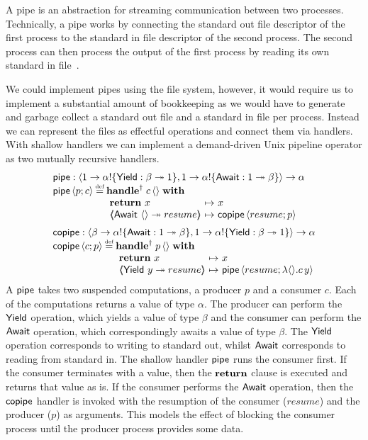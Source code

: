 \documentclass[12pt,phd,lfcs,twoside,openright,logo,leftchapter,normalheadings]{infthesis}
\theoremstyle{plain}
\theoremstyle{definition}
\begin{document}
A \UNIX{} pipe is an abstraction for streaming communication between
two processes. Technically, a pipe works by connecting the standard
out file descriptor of the first process to the standard in file
descriptor of the second process. The second process can then process
the output of the first process by reading its own standard in
file~\cite{RitchieT74}.

We could implement pipes using the file system, however, it would
require us to implement a substantial amount of bookkeeping as we
would have to generate and garbage collect a standard out file and a
standard in file per process. Instead we can represent the files as
effectful operations and connect them via handlers.
%
With shallow handlers we can implement a demand-driven Unix pipeline
operator as two mutually recursive handlers.
%
\[
\bl
   \Pipe   : \Record{\UnitType \to \alpha \eff \{ \Yield : \beta \opto \UnitType \}, \UnitType \to \alpha\eff\{ \Await : \UnitType \opto \beta \}}          \to \alpha \\
   \Pipe\, \Record{p; c} \defas
        \bl
          \ShallowHandle\; c\,\Unit \;\With\; \\
           ~\ba[m]{@{}l@{~}c@{~}l@{}}
              \Return~x &\mapsto& x \\
              \OpCase{\Await}{\Unit}{resume}  &\mapsto& \Copipe\,\Record{resume; p} \\
            \ea
        \el\medskip\\

   \Copipe : \Record{\beta \to \alpha\eff\{ \Await : \UnitType \opto \beta\},    \UnitType \to \alpha\eff\{ \Yield : \beta \opto \UnitType\}} \to \alpha \\
   \Copipe\, \Record{c; p} \defas
      \bl
         \ShallowHandle\; p\,\Unit \;\With\; \\
          ~\ba[m]{@{}l@{~}c@{~}l@{}}
             \Return~x &\mapsto& x \\
             \OpCase{\Yield}{y}{resume} &\mapsto& \Pipe\,\Record{resume; \lambda \Unit. c\, y} \\
           \ea \\
      \el \\
\el
\]
%
A $\mathsf{pipe}$ takes two suspended computations, a producer $p$ and a
consumer $c$.
%
Each of the computations returns a value of type $\alpha$.
%
The producer can perform the $\mathsf{Yield}$ operation, which yields a value
of type $\beta$ and the consumer can perform the $\mathsf{Await}$ operation,
which correspondingly awaits a value of type $\beta$. The $\mathsf{Yield}$
operation corresponds to writing to standard out, whilst $\mathsf{Await}$
corresponds to reading from standard in.
%
The shallow handler $\mathsf{pipe}$ runs the consumer first. If the consumer
terminates with a value, then the $\mathbf{return}$ clause is executed and
returns that value as is. If the consumer performs the $\mathsf{Await}$
operation, then the $\mathsf{copipe}$ handler is invoked with the resumption
of the consumer ($resume$) and the producer ($p$) as arguments. This
models the effect of blocking the consumer process until the producer
process provides some data.
\end{document}
